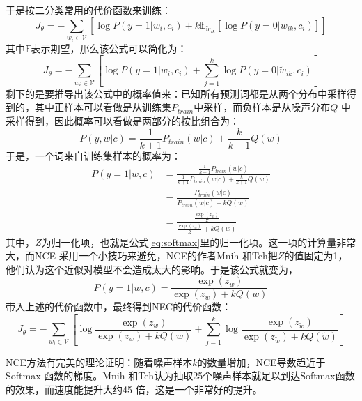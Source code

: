 \documentclass[12pt,a4paper]{article}
\begin{document}
于是按二分类常用的代价函数来训练：
\begin{equation}
J_\theta = -\sum\limits_{w_i \in \mathcal{V}}{[\log P(y=1|w_i, c_i) + k\mathbb{E}_{\tilde{w}_{ik}}[\log P(y=0|\tilde{w}_{ik}, c_i)]]}
\end{equation}
其中$\mathbb{E}$表示期望，那么该公式可以简化为：
\begin{equation}
J_\theta = -\sum\limits_{w_i \in \mathcal{V}}{[\log P(y=1|w_i, c_i) + \sum\limits_{j=1}^k{\log P(y=0|\tilde{w}_{ik}, c_i)}]}
\end{equation}
剩下的是要推导出该公式中的概率值来：已知所有预测词都是从两个分布中采样得到的，其中正样本可以看做是从训练集${P_{train}}$中采样，而负样本是从噪声分布$Q$ 中采样得到，因此概率可以看做是两部分的按比组合为：
\begin{equation}
P(y,w|c) = \frac{1}{k+1} P_{train}(w|c) + \frac{k}{k+1}Q(w)
\end{equation}
于是，一个词来自训练集样本的概率为：
\begin{equation}
\begin{split}
P(y=1|w,c) &=  \frac{\frac{1}{k+1} P_{train}(w|c)}{\frac{1}{k+1} P_{train}(w|c) + \frac{k}{k+1}Q(w)} \\
           &= \frac{P_{train}(w|c)}{P_{train}(w|c) + kQ(w)} \\
           &= \frac{\frac{\exp(z_w)}{Z}}{\frac{\exp(z_w)}{Z} + kQ(w)}
\end{split}
\end{equation}
其中，$Z$为归一化项，也就是公式\ref{eq:softmax}里的归一化项。这一项的计算量非常大，而NCE 采用一个小技巧来避免，NCE的作者Mnih 和Teh把$Z$的值固定为1，他们认为这个近似对模型不会造成太大的影响。于是该公式就变为，
\begin{equation}
  P(y=1|w,c) = \frac{\exp(z_w)}{\exp(z_w) + kQ(w)}
\end{equation}
带入上述的代价函数中，最终得到NEC的代价函数：
\begin{equation}
J_\theta = -\sum\limits_{w_i \in \mathcal{V}}{\left[\log \frac{\exp(z_w)}{\exp(z_w) + kQ(w)} + \sum\limits_{j=1}^k{\log \frac{\exp(z_{\tilde{w}})}{\exp(z_{\tilde{w}}) + kQ(\tilde{w})}}\right]}
\end{equation}

NCE方法有完美的理论证明：随着噪声样本$k$的数量增加，NCE导数趋近于Softmax 函数的梯度。Mnih 和Teh认为抽取25个噪声样本就足以到达Softmax函数的效果，而速度能提升大约45 倍，这是一个非常好的提升\cite{DBLP:conf/icml/MnihT12}。
\end{document}

